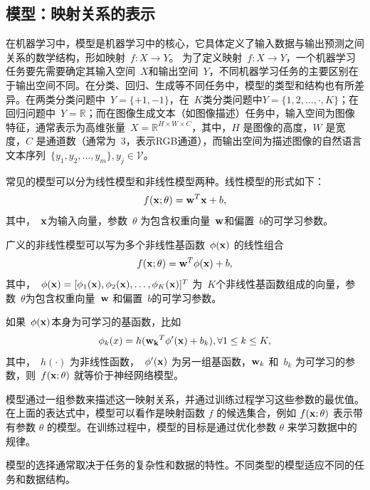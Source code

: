 \subsection{模型：映射关系的表示}

在机器学习中，模型是机器学习中的核心，它具体定义了输入数据与输出预测之间关系的数学结构，形如映射~$f: X \rightarrow Y$。
为了定义映射~$f: X \rightarrow Y$，一个机器学习任务要先需要确定其输入空间~$X$和输出空间~$Y$，不同机器学习任务的主要区别在于输出空间不同。在分类、回归、生成等不同任务中，模型的类型和结构也有所差异。在两类分类问题中~$Y = \{+1,−1\}$，在~$K$类分类问题中$Y =\{1, 2,\dots,· , K\}$；在回归问题中~$Y = \mathbb{R}$；而在图像生成文本（如图像描述）任务中，输入空间为图像特征，通常表示为高维张量~$X=\mathbb{R}^{H\times W\times C}$，其中，$H$ 是图像的高度，$W$ 是宽度，$C$ 是通道数（通常为~$3$，表示RGB通道），而输出空间为描述图像的自然语言文本序列~$\{y_1,y_2,\dots, y_m \}, y_j\in \mathcal{V}$。


常见的模型可以分为线性模型和非线性模型两种。线性模型的形式如下：
$$
f({\bf x}; \theta)= {\bf w}^T{\bf x} +b, 
$$
其中，~${\bf x}$为输入向量，参数~$\theta$ 为包含权重向量~${\bf w}$和偏置~$b$的可学习参数。

广义的非线性模型可以写为多个非线性基函数~$\phi({\bf x})$ 的线性组合
\begin{equation*}\label{ref}
f({\bf x}; \theta) = {\bf w}^T {\bf \phi}({\bf x}) + b, 
\end{equation*}
其中，~$\phi({\bf x}) = [ \phi_1({\bf x}),\phi_2({\bf x}),\dots ,\phi_K({\bf x})]^T$ 为~$K$个非线性基函数组成的向量，参数~$\theta$为包含权重向量~${\bf w}$ 和偏置~$b$的可学习参数。

如果~$\phi({\bf x})$本身为可学习的基函数，比如
\begin{equation*}
\phi_k(x) = h({\bf w_k}^T\phi^\prime({\bf x}) + b_k), \forall 1 \le  k \le K,
\end{equation*}  
其中，~$h(\cdot)$ 为非线性函数，~$\phi^\prime ({\bf x})$ 为另一组基函数，${\bf w}_k$ 和~$b_k$ 为可学习的参数，则~$f ({\bf x};\theta)$ 就等价于神经网络模型。

模型通过一组参数来描述这一映射关系，并通过训练过程学习这些参数的最优值。在上面的表达式中，模型可以看作是映射函数 $f$ 的候选集合，例如 $f ({\bf x};\theta)$ 表示带有参数 $\theta$ 的模型。在训练过程中，模型的目标是通过优化参数 $\theta$ 来学习数据中的规律。

模型的选择通常取决于任务的复杂性和数据的特性。不同类型的模型适应不同的任务和数据结构。

